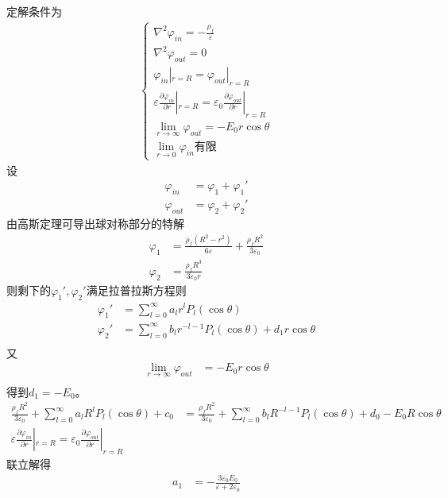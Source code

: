 \documentclass{phyasgn}
\begin{document}
\begin{sol}[5]
  定解条件为
  \begin{align*}
    \left\{\begin{matrix}
      \nabla^2\varphi_{in}=-\frac{\rho_f}{\varepsilon}\\
      \nabla^2\varphi_{out}=0\\
      \varphi_{in}|_{r=R}=\varphi_{out}|_{r=R}\\
    \varepsilon\frac{\partial\varphi_{in}}{\partial r}|_{r=R}=\varepsilon_0\frac{\partial\varphi_{out}}{\partial r}|_{r=R}\\
    \lim_{r\to\infty}\varphi_{out}=-E_0r\cos\theta\\
    \lim_{r\to0}\varphi_{in}\text{有限}
    \end{matrix}\right.
  \end{align*}
  设
  \begin{align*}
    \varphi_{in}&=\varphi_1+\varphi_1'\\
    \varphi_{out}&=\varphi_2+\varphi_2'
  \end{align*}
  由高斯定理可导出球对称部分的特解
  \begin{align*}
    \varphi_1&=\frac{\rho_f(R^2-r^2)}{6\varepsilon}+\frac{\rho_fR^2}{3\varepsilon_0}\\
    \varphi_2&=\frac{\rho_fR^3}{3\varepsilon_0r}
  \end{align*}
  则剩下的$\varphi_1',\varphi_2'$满足拉普拉斯方程则
  \begin{align*}
    \varphi_1'&=\sum_{l=0}^{\infty}a_lr^lP_l(\cos\theta)\\
    \varphi_2'&=\sum_{l=0}^{\infty}b_lr^{-l-1}P_l(\cos\theta)+d_1r\cos\theta\\
  \end{align*}
  又
  \begin{align*}
    \lim_{r\to\infty}\varphi_{out}&=-E_0r\cos\theta\\
  \end{align*}
  得到$d_1=-E_0$。
  \begin{align*}
    \frac{\rho_fR^2}{3\varepsilon_0}+\sum_{l=0}^{\infty}a_lR^lP_l(\cos\theta)+c_0&=\frac{\rho_fR^2}{3\varepsilon_0}+\sum_{l=0}^{\infty}b_lR^{-l-1}P_l(\cos\theta)+d_0-E_0R\cos\theta\\
    \varepsilon\frac{\partial\varphi_{in}}{\partial r}|_{r=R}=\varepsilon_0\frac{\partial\varphi_{out}}{\partial r}|_{r=R}
  \end{align*}
  联立解得
  \begin{align*}
    a_1&=-\frac{3\varepsilon_0E_0}{\varepsilon+2\varepsilon_0}\\

\end{align*}
\end{sol}
\end{document}

